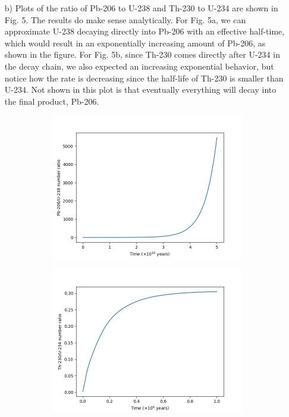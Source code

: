 \documentclass{article}
\begin{document}
\begin{itemize}
    \item[b)] Plots of the ratio of Pb-206 to U-238 and Th-230 to U-234 are shown in Fig. 5. The results do make sense analytically. For Fig. 5a, we can approximate U-238 decaying directly into Pb-206 with an effective half-time, which would result in an exponentially increasing amount of Pb-206, as shown in the figure. For Fig. 5b, since Th-230 comes directly after U-234 in the decay chain, we also expected an increasing exponential behavior, but notice how the rate is decreasing since the half-life of Th-230 is smaller than U-234. Not shown in this plot is that eventually everything will decay into the final product, Pb-206.
    \begin{figure}[h!]
    \centering
    \begin{subfigure}{.5\textwidth}
      \centering
      \includegraphics[width=\linewidth]{images/prob3_pb206_u238.png}
      \caption{}
    \end{subfigure}%
    \begin{subfigure}{.5\textwidth}
      \centering
      \includegraphics[width=\linewidth]{images/prob3_th230_u234.png}

\end{subfigure}
\end{figure}
\end{itemize}
\end{document}
